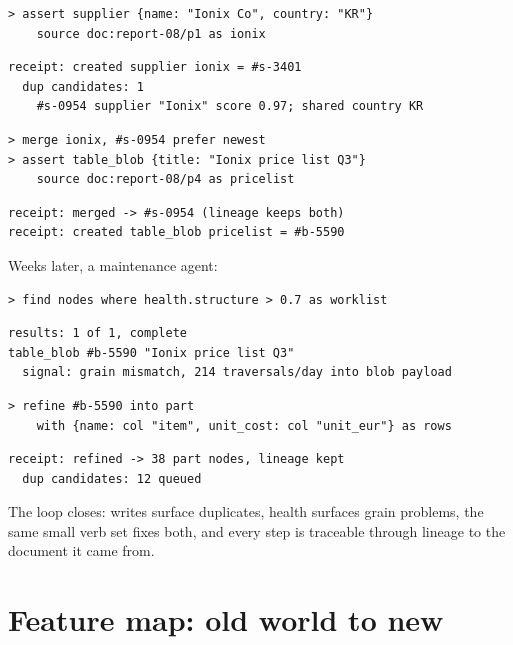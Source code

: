 \documentclass[11pt]{article}
\begin{document}
\begin{lstlisting}[style=new]
> assert supplier {name: "Ionix Co", country: "KR"}
    source doc:report-08/p1 as ionix
\end{lstlisting}
\begin{lstlisting}[style=result]
receipt: created supplier ionix = #s-3401
  dup candidates: 1
    #s-0954 supplier "Ionix" score 0.97; shared country KR
\end{lstlisting}

\begin{lstlisting}[style=new]
> merge ionix, #s-0954 prefer newest
> assert table_blob {title: "Ionix price list Q3"}
    source doc:report-08/p4 as pricelist
\end{lstlisting}
\begin{lstlisting}[style=result]
receipt: merged -> #s-0954 (lineage keeps both)
receipt: created table_blob pricelist = #b-5590
\end{lstlisting}

Weeks later, a maintenance agent:

\begin{lstlisting}[style=new]
> find nodes where health.structure > 0.7 as worklist
\end{lstlisting}
\begin{lstlisting}[style=result]
results: 1 of 1, complete
table_blob #b-5590 "Ionix price list Q3"
  signal: grain mismatch, 214 traversals/day into blob payload
\end{lstlisting}

\begin{lstlisting}[style=new]
> refine #b-5590 into part
    with {name: col "item", unit_cost: col "unit_eur"} as rows
\end{lstlisting}
\begin{lstlisting}[style=result]
receipt: refined -> 38 part nodes, lineage kept
  dup candidates: 12 queued
\end{lstlisting}

The loop closes: writes surface duplicates, health surfaces grain problems, the same small verb set fixes both, and every step is traceable through lineage to the document it came from.

\section{Feature map: old world to new}
\end{document}
